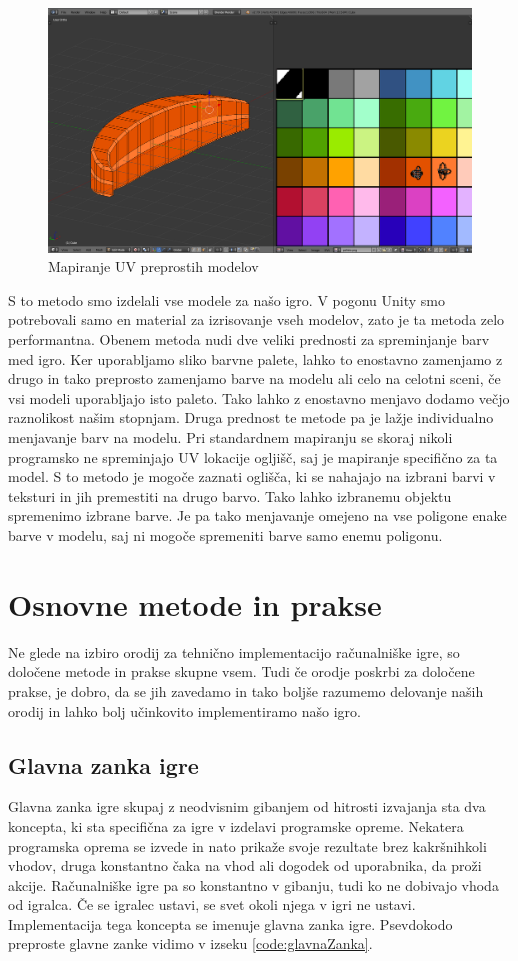 \documentclass[12pt,a4paper,twoside]{book}
\begin{document}
\begin{figure}[h]
	\centering
	\includegraphics[width=14cm]{texturePalette}
	\caption{Mapiranje UV preprostih modelov}
	\label{slika:texturePalette}
\end{figure}

S to metodo smo izdelali vse modele za našo igro. V pogonu Unity smo potrebovali samo en material za izrisovanje vseh modelov, zato je ta metoda zelo performantna. Obenem metoda nudi dve veliki prednosti za spreminjanje barv med igro. Ker uporabljamo sliko barvne palete, lahko to enostavno zamenjamo z drugo in tako preprosto zamenjamo barve na modelu ali celo na celotni sceni, če vsi modeli uporabljajo isto paleto. Tako lahko z enostavno menjavo dodamo večjo raznolikost našim stopnjam. Druga prednost te metode pa je lažje individualno menjavanje barv na modelu. Pri standardnem mapiranju se skoraj nikoli programsko ne spreminjajo UV lokacije ogljišč, saj je mapiranje specifično za ta model. S to metodo je mogoče zaznati oglišča, ki se nahajajo na izbrani barvi v teksturi in jih premestiti na drugo barvo. Tako lahko izbranemu objektu spremenimo izbrane barve. Je pa tako menjavanje omejeno na vse poligone enake barve v modelu, saj ni mogoče spremeniti barve samo enemu poligonu.

\section{Osnovne metode in prakse}
Ne glede na izbiro orodij za tehnično implementacijo računalniške igre, so določene metode in prakse skupne vsem. Tudi če orodje poskrbi za določene prakse, je dobro, da se jih zavedamo in tako boljše razumemo delovanje naših orodij in lahko bolj učinkovito implementiramo našo igro.

\subsection{Glavna zanka igre}
Glavna zanka igre skupaj z neodvisnim gibanjem od hitrosti izvajanja sta dva koncepta, ki sta specifična za igre v izdelavi programske opreme. Nekatera programska oprema se izvede in nato prikaže svoje rezultate brez kakršnihkoli vhodov, druga konstantno čaka na vhod ali dogodek od uporabnika, da proži akcije. Računalniške igre pa so konstantno v gibanju, tudi ko ne dobivajo vhoda od igralca. Če se igralec ustavi, se svet okoli njega v igri ne ustavi. Implementacija tega koncepta se imenuje glavna zanka igre. Psevdokodo preproste glavne zanke vidimo v izseku \ref{code:glavnaZanka}.
\end{document}
